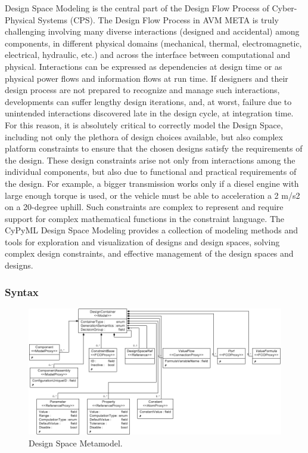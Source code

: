 Design Space Modeling is the central part of the Design Flow Process of Cyber-Physical Systems (CPS). The Design Flow Process in AVM META is truly challenging involving many diverse interactions (designed and accidental) among components, in different physical domains (mechanical, thermal, electromagnetic, electrical, hydraulic, etc.) and across the interface between computational and physical. Interactions can be expressed as dependencies at design time or as physical power flows and information flows at run time. If designers and their design process are not prepared to recognize and manage such interactions, developments can suffer lengthy design iterations, and, at worst, failure due to unintended interactions discovered late in the design cycle, at integration time. For this reason, it is absolutely critical to correctly model the Design Space, including not only the plethora of design choices available, but also complex platform constraints to ensure that the chosen designs satisfy the requirements of the design. These design constraints arise not only from interactions among the individual components, but also due to functional and practical requirements of the design. For example, a bigger transmission works only if a diesel engine with large enough torque is used, or the vehicle must be able to acceleration a 2 m/s2 on a 20-degree uphill. Such constraints are complex to represent and require support for complex mathematical functions in the constraint language. The CyPyML Design Space Modeling provides a collection of modeling methods and tools for exploration and visualization of designs and design spaces, solving complex design constraints, and effective management of the design spaces and designs.

\subsubsection{Syntax}

\begin{figure}[t]
\centering
\includegraphics[scale=0.40]{Figures/DesignSpaceMetamodel.png}
\caption{Design Space Metamodel.}
\label{fig:designspacemetamodel}
\end{figure}

